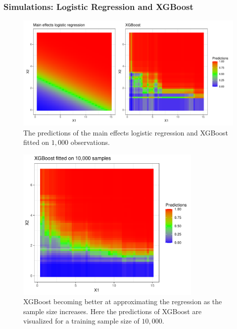 \documentclass{beamer}
\begin{document}
\begin{frame}
    \frametitle{Simulations: Logistic Regression and XGBoost} 
    \begin{figure}
        \centering
        \centerline{\includegraphics[width=1.1\textwidth]{figures/predictpar.pdf}}
        \caption{The predictions of the main effects logistic regression and XGBoost fitted on $ 1,000 $ observations.}
        \label{fig:predictpar}
    \end{figure}
\end{frame}

\begin{frame}
    \begin{figure}[H]
        \centering
        \includegraphics[width=0.8\textwidth]{figures/xgboost10k.pdf}
        \caption{XGBoost becoming better at approximating the regression as the sample size increases. Here the predictions of XGBoost are visualized for a training sample size of $ 10,000 $. }
        \label{fig:xgboost10k}
    \end{figure}
\end{frame}
\end{document}
